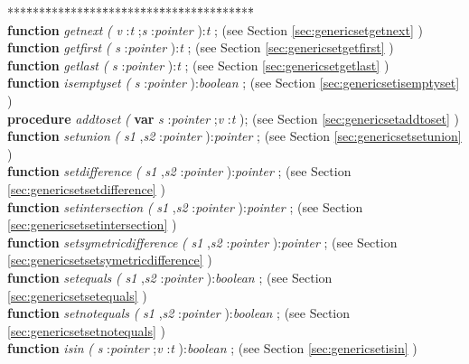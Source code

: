 \documentclass[10pt, a4paper]{article}
\begin{document}
\begin{tabbing}
***\=***\=***\=***\=***\=***\=***\=***\=***\=***\=***\=***\=***\=\kill
\+ \\
\+\textsf{\textbf{function}  \textit{getnext} \textit{(} \textit{v} :\textit{t} ;\textit{s} :\textit{pointer} ):\textit{t} ;} (see Section \ref{sec:genericsetgetnext} )\\
\<\textsf{\textbf{function}  \textit{getfirst} \textit{(} \textit{s} :\textit{pointer} ):\textit{t} ;} (see Section \ref{sec:genericsetgetfirst} )\\
\<\textsf{\textbf{function}  \textit{getlast} \textit{(} \textit{s} :\textit{pointer} ):\textit{t} ;} (see Section \ref{sec:genericsetgetlast} )\\
\<\textsf{\textbf{function}  \textit{isemptyset} \textit{(} \textit{s} :\textit{pointer} ):\textit{boolean} ;} (see Section \ref{sec:genericsetisemptyset} )\\
\<\textsf{\textbf{procedure}  \textit{addtoset} \textit{(} \textbf{var}  \textit{s} :\textit{pointer} ;\textit{v} :\textit{t} );} (see Section \ref{sec:genericsetaddtoset} )\\
\<\textsf{\textbf{function}  \textit{setunion} \textit{(} \textit{s1} ,\textit{s2} :\textit{pointer} ):\textit{pointer} ;} (see Section \ref{sec:genericsetsetunion} )\\
\<\textsf{\textbf{function}  \textit{setdifference} \textit{(} \textit{s1} ,\textit{s2} :\textit{pointer} ):\textit{pointer} ;} (see Section \ref{sec:genericsetsetdifference} )\\
\<\textsf{\textbf{function}  \textit{setintersection} \textit{(} \textit{s1} ,\textit{s2} :\textit{pointer} ):\textit{pointer} ;} (see Section \ref{sec:genericsetsetintersection} )\\
\<\textsf{\textbf{function}  \textit{setsymetricdifference} \textit{(} \textit{s1} ,\textit{s2} :\textit{pointer} ):\textit{pointer} ;} (see Section \ref{sec:genericsetsetsymetricdifference} )\\
\<\textsf{\textbf{function}  \textit{setequals} \textit{(} \textit{s1} ,\textit{s2} :\textit{pointer} ):\textit{boolean} ;} (see Section \ref{sec:genericsetsetequals} )\\
\<\textsf{\textbf{function}  \textit{setnotequals} \textit{(} \textit{s1} ,\textit{s2} :\textit{pointer} ):\textit{boolean} ;} (see Section \ref{sec:genericsetsetnotequals} )\\
\<\textsf{\textbf{function}  \textit{isin} \textit{(} \textit{s} :\textit{pointer} ;\textit{v} :\textit{t} ):\textit{boolean} ;} (see Section \ref{sec:genericsetisin} )\\

\end{tabbing}
\end{document}
